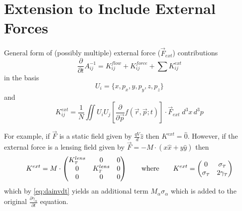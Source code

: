 
\section{Extension to Include External Forces}

General form of (possibly multiple) external force ($\vec{F}_{ext}$) contributions
\begin{equation}
  \frac{\partial}{\partial t} A^{-1}_{ij} = K^{flow}_{ij} + K^{force}_{ij} + \sum K^{ext}_{ij}
\end{equation}
in the basis
\begin{equation}
  U_{i} = \lbrace x, p_x, y, p_y, z, p_z \rbrace
\end{equation}
and
\begin{equation}
  K^{ext}_{ij} = \frac{1}{N} \iint U_i U_j \left [ \frac{\partial}{\partial \vec{p}} f(\vec{r}, \vec{p}; t) \right ] \cdot \vec{F}_{ext}\;d^{3}x\,d^{3}p
\end{equation}

For example, if $\vec{F}$ is a static field given by $\frac{qV}{d}\hat{z}$ then $K^{ext} = \hat{0}$. However, if the external force is a lensing field given by $\vec{F} = -M\cdot(x\hat{x}+y\hat{y})$ then 
\begin{equation}
  K^{ext} = M \cdot 
  \begin{pmatrix}
    K^{lens}_{{\scriptscriptstyle T}} & 0 & 0 \\
    0 & K^{lens}_{{\scriptscriptstyle T}} & 0 \\
    0 & 0 & 0
  \end{pmatrix}
  \qquad \text{where} \qquad
  K^{ext} = 
  \begin{pmatrix}
    0 & \sigma_{{\scriptscriptstyle T}} \\
    \sigma_{{\scriptscriptstyle T}} & 2 \gamma_{{\scriptscriptstyle T}}
  \end{pmatrix}
\end{equation}
which by \ref{eq:dainvdt} yields an additional term $M_{\alpha} \sigma_{\alpha}$ which is added to the original $\frac{\partial \gamma_{\alpha}}{\partial t}$ equation.
